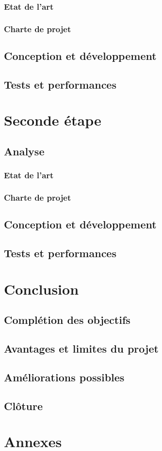 \documentclass[a4paper, 12pt]{report}
\begin{document}
        \subsection{Etat de l'art}
        \subsection{Charte de projet}
    \section{Conception et développement}
    \section{Tests et performances}


\chapter{Seconde étape}
\minitoc
{}
\clearpage
    \section{Analyse}
        \subsection{Etat de l'art}
        \subsection{Charte de projet}
    \section{Conception et développement}
    \section{Tests et performances}

\chapter{Conclusion}
\minitoc
{}
\clearpage
    \section{Complétion des objectifs}
    \section{Avantages et limites du projet}
    \section{Améliorations possibles}
    \section{Clôture}

\chapter{Annexes}
\minitoc
{}
\clearpage            

\appendix
\end{document}
